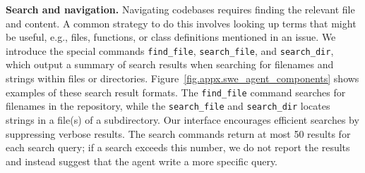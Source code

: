 

\textbf{Search and navigation.}
Navigating codebases requires finding the relevant file and content.
A common strategy to do this involves looking up terms that might be useful, e.g., files, functions, or class definitions mentioned in an issue. 
We introduce the special commands \texttt{find\_file}, \texttt{search\_file}, and \texttt{search\_dir}, which output a summary of search results when searching for filenames and strings within files or directories.
Figure~\ref{fig.appx.swe_agent_components} shows examples of these search result formats. 
The \texttt{find\_file} command searches for filenames in the repository, while the \texttt{search\_file} and \texttt{search\_dir} locates strings in a file(s) of a subdirectory. Our interface encourages efficient searches by suppressing verbose results. The search commands return at most \num{50} results for each search query; if a search exceeds this number, we do not report the results and instead suggest that the agent write a more specific query.

